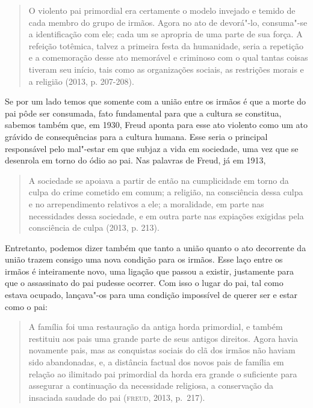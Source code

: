 \begin{quote}
O violento pai primordial era certamente o modelo invejado e temido de
cada membro do grupo de irmãos. Agora no ato de devorá"-lo, consuma"-se a
identificação com ele; cada um se apropria de uma parte de sua força. A
refeição totêmica, talvez a primeira festa da humanidade, seria a
repetição e a comemoração desse ato memorável e criminoso com o qual
tantas coisas tiveram seu início, tais como as organizações sociais, as
restrições morais e a religião (2013, p. 207-208).
\end{quote}

Se por um lado temos que somente com a união entre os irmãos é que a
morte do pai pôde ser consumada, fato fundamental para que a cultura se
constitua, sabemos também que, em 1930, Freud aponta para esse ato
violento como um ato grávido de consequências para a cultura humana.
Esse seria o principal responsável pelo mal"-estar em que subjaz a vida
em sociedade, uma vez que se desenrola em torno do ódio ao pai. Nas
palavras de Freud, já em 1913,

\begin{quote}
A sociedade se apoiava a partir de então na cumplicidade em torno da
culpa do crime cometido em comum; a religião, na consciência dessa culpa
e no arrependimento relativos a ele; a moralidade, em parte nas
necessidades dessa sociedade, e em outra parte nas expiações exigidas
pela consciência de culpa (2013, p. 213).
\end{quote}

Entretanto, podemos dizer também que tanto a união quanto o ato
decorrente da união trazem consigo uma nova condição para os irmãos.
Esse laço entre os irmãos é inteiramente novo, uma ligação que passou a
existir, justamente para que o assassinato do pai pudesse ocorrer. Com
isso o lugar do pai, tal como estava ocupado, lançava"-os para uma
condição impossível de querer ser e estar como o pai:

\begin{quote}
A família foi uma restauração da antiga horda primordial, e também
restituiu aos pais uma grande parte de seus antigos direitos. Agora
havia novamente pais, mas as conquistas sociais do clã dos irmãos não
haviam sido abandonadas, e, a distância factual dos novos pais de
família em relação ao ilimitado pai primordial da horda era grande o
suficiente para assegurar a continuação da necessidade religiosa, a
conservação da insaciada saudade do pai (\textsc{freud}, 2013, p.~217).
\end{quote}

